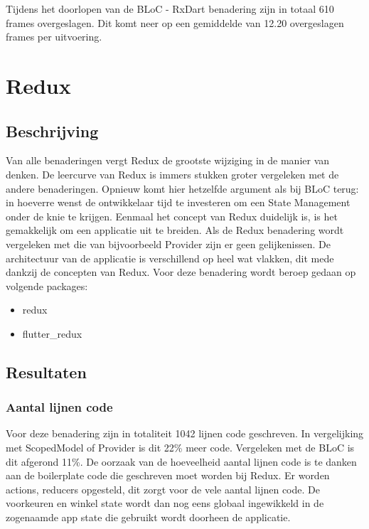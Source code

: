 Tijdens het doorlopen van de BLoC - RxDart benadering zijn in totaal 610 frames overgeslagen. Dit komt neer op een gemiddelde van 12.20 overgeslagen frames per uitvoering.

\section{Redux}
\subsection{Beschrijving}
Van alle benaderingen vergt Redux de grootste wijziging in de manier van denken. De leercurve van Redux is immers stukken groter vergeleken met de andere benaderingen. Opnieuw komt hier hetzelfde argument als bij BLoC terug: in hoeverre wenst de ontwikkelaar tijd te investeren om een State Management onder de knie te krijgen. Eenmaal het concept van Redux duidelijk is, is het gemakkelijk om een applicatie uit te breiden. 
Als de Redux benadering wordt vergeleken met die van bijvoorbeeld Provider zijn er geen gelijkenissen. De architectuur van de applicatie is verschillend op heel wat vlakken, dit mede dankzij de concepten van Redux. \newline
Voor deze benadering wordt beroep gedaan op volgende packages: 
\begin{itemize}
    \item{redux}
    \item{flutter\_redux}
\end{itemize}
\subsection{Resultaten}


\subsubsection{Aantal lijnen code}
Voor deze benadering zijn in totaliteit 1042 lijnen code geschreven. In vergelijking met ScopedModel of Provider is dit 22\% meer code. Vergeleken met de BLoC is dit afgerond 11\%. \newline
De oorzaak van de hoeveelheid aantal lijnen code is te danken aan de boilerplate code die geschreven moet worden bij Redux. Er worden actions, reducers opgesteld, dit zorgt voor de vele aantal lijnen code. De voorkeuren en winkel state wordt dan nog eens globaal ingewikkeld in de zogenaamde app state die gebruikt wordt doorheen de applicatie.


